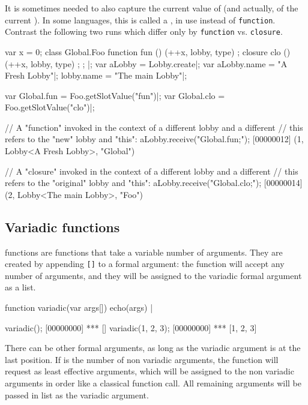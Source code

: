 It is sometimes needed to also capture the current value of \this (and
actually, of the current ).  In some languages, this is
called a , in \us use  instead of
\lstinline{function}.  Contrast the following two runs which differ only by
\lstinline{function} vs. \lstinline{closure}.

\begin{urbiscript}
{
  var x = 0;
  class Global.Foo
  {
    function fun () { (++x, lobby, type) };
    closure  clo () { (++x, lobby, type) };
  };
}|;
var aLobby = Lobby.create|;
var aLobby.name = "A Fresh Lobby"|;
lobby.name = "The main Lobby"|;

var Global.fun = Foo.getSlotValue("fun")|;
var Global.clo = Foo.getSlotValue("clo")|;

// A "function" invoked in the context of a different lobby and a different
// this refers to the "new" lobby and "this":
aLobby.receive("Global.fun;");
[00000012] (1, Lobby<A Fresh Lobby>, "Global")

// A "closure" invoked in the context of a different lobby and a different
// this refers to the "original" lobby and "this":
aLobby.receive("Global.clo;");
[00000014] (2, Lobby<The main Lobby>, "Foo")
\end{urbiscript}


\subsection{Variadic functions}
\label{sec:lang:fun-variadic}

 functions are functions that take a variable number of
arguments. They are created by appending \lstinline|[]| to a formal
argument: the function will accept any number of arguments, and they will be
assigned to the variadic formal argument as a list.

\begin{urbiscript}
function variadic(var args[])
{
  echo(args)
} |

variadic();
[00000000] *** []
variadic(1, 2, 3);
[00000000] *** [1, 2, 3]
\end{urbiscript}

There can be other formal arguments, as long as the variadic argument is at
the last position. If  is the number of non variadic arguments, the
function will request as least  effective arguments, which will be
assigned to the non variadic arguments in order like a classical function
call. All remaining arguments will be passed in list as the variadic
argument.

